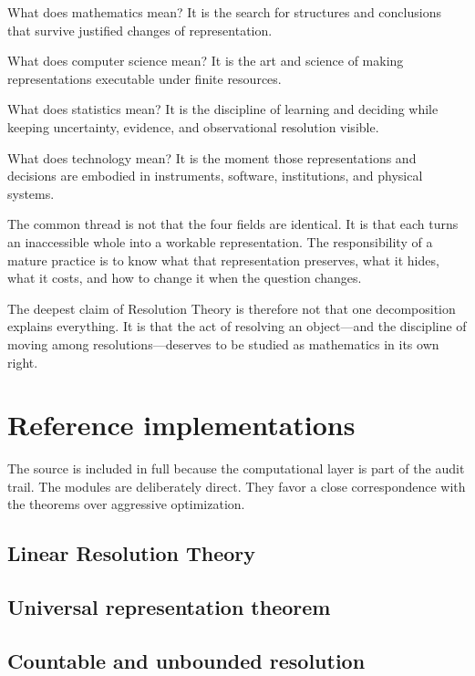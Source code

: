 \documentclass[11pt]{article}
\theoremstyle{definition}
\theoremstyle{remark}
\begin{document}
What does mathematics mean?  It is the search for structures and conclusions that survive justified changes of representation.

What does computer science mean?  It is the art and science of making representations executable under finite resources.

What does statistics mean?  It is the discipline of learning and deciding while keeping uncertainty, evidence, and observational resolution visible.

What does technology mean?  It is the moment those representations and decisions are embodied in instruments, software, institutions, and physical systems.

The common thread is not that the four fields are identical.  It is that each turns an inaccessible whole into a workable representation.  The responsibility of a mature practice is to know what that representation preserves, what it hides, what it costs, and how to change it when the question changes.

The deepest claim of Resolution Theory is therefore not that one decomposition explains everything.  It is that the act of resolving an object---and the discipline of moving among resolutions---deserves to be studied as mathematics in its own right.
\clearpage
\section{Reference implementations}
\label{sec:resolution-reference-code}

The source is included in full because the computational layer is part of the audit trail.  The modules are deliberately direct.  They favor a close correspondence with the theorems over aggressive optimization.

\subsection{Linear Resolution Theory}


\clearpage
\subsection{Universal representation theorem}


\clearpage
\subsection{Countable and unbounded resolution}

\end{document}
